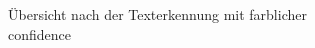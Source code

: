 \documentclass[notables, nomenclature, oneside, 150]{HSMW-Thesis}
\begin{document}
\begin{figure}[h!]
\begin{subfigure}[t]{0.3\textwidth}
        			\caption{Übersicht nach der Texterkennung mit farblicher confidence}
        			\label{fig:ocr2}
    			\end{subfigure}
    			\begin{subfigure}[t]{0.3\textwidth}

\end{subfigure}
\end{figure}
\end{document}
